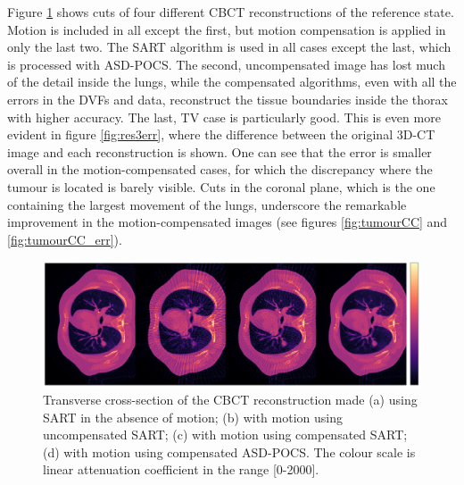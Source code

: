 Figure \ref{fig:res3} shows cuts of four different CBCT reconstructions of the reference state.  Motion is included in all except the first, but motion compensation is applied in only the last two.  The SART algorithm is used in all cases except the last, which is processed with ASD-POCS.  The second, uncompensated image has lost much of the detail inside the lungs, while the compensated algorithms, even with all the errors in the DVFs and data, reconstruct the tissue boundaries inside the thorax with higher accuracy.  The last, TV case is particularly good.  This is even more evident in figure \ref{fig:res3err}, where the difference between the original 3D-CT image and each reconstruction is shown.  One can see that the error is smaller overall in the motion-compensated cases, for which the discrepancy where the tumour is located is barely visible.  Cuts in the coronal plane, which is the one containing the largest movement of the lungs, underscore the remarkable improvement in the motion-compensated images (see figures \ref{fig:tumourCC} and \ref{fig:tumourCC_err}).

\begin{figure}[H]
\begin{center} 

\includegraphics[width=1\linewidth]{MotionCorrection/res32.png} 
\hspace{0.1cm}{\footnotesize (a)}\hspace{3.2cm}{\footnotesize (b)}\hspace{3.2cm}{\footnotesize (c)}\hspace{3.2cm}{\footnotesize (d)}

\caption[Reconstruction of POPI with SART, SART and motion, MC-SART and MC-ASD-POCS]{\label{fig:res3}  Transverse cross-section of the CBCT reconstruction made (a) using SART in the absence of motion; (b) with motion using uncompensated SART; (c) with motion using compensated SART; (d) with motion using compensated ASD-POCS. The colour scale is linear attenuation coefficient in the range [0-2000].} 
\end{center} 
\end{figure}

